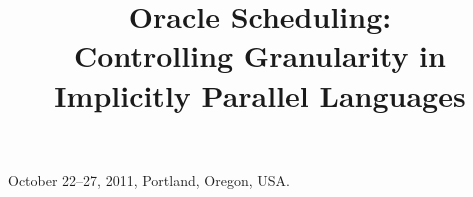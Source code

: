 \documentclass[10pt]{sigplanconf}
\title{Oracle Scheduling: \\Controlling Granularity in Implicitly Parallel Languages}
\begin{document}
 {October 22--27, 2011, Portland, Oregon, USA.}

\maketitle



\end{document}
